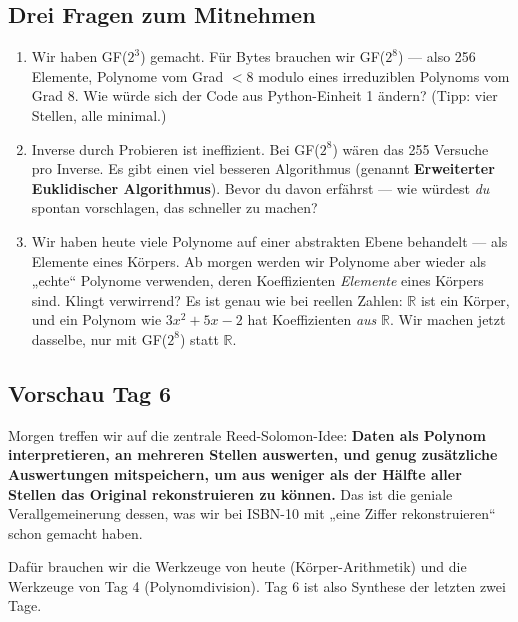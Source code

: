 \subsection*{Drei Fragen zum Mitnehmen}

\begin{enumerate}
\item Wir haben GF($2^3$) gemacht. Für Bytes brauchen wir GF($2^8$)
  — also 256 Elemente, Polynome vom Grad $< 8$ modulo eines
  irreduziblen Polynoms vom Grad 8. Wie würde sich der Code aus
  Python-Einheit 1 ändern? (Tipp: vier Stellen, alle minimal.)

\item Inverse durch Probieren ist ineffizient. Bei GF($2^8$) wären
  das 255 Versuche pro Inverse. Es gibt einen viel besseren
  Algorithmus (genannt \textbf{Erweiterter Euklidischer
  Algorithmus}). Bevor du davon erfährst — wie würdest \emph{du}
  spontan vorschlagen, das schneller zu machen?

\item Wir haben heute viele Polynome auf einer abstrakten Ebene
  behandelt — als Elemente eines Körpers. Ab morgen werden wir
  Polynome aber wieder als „echte“ Polynome verwenden, deren
  Koeffizienten \emph{Elemente} eines Körpers sind. Klingt
  verwirrend? Es ist genau wie bei reellen Zahlen: $\mathbb{R}$ ist
  ein Körper, und ein Polynom wie $3x^2 + 5x - 2$ hat Koeffizienten
  \emph{aus} $\mathbb{R}$. Wir machen jetzt dasselbe, nur mit
  GF($2^8$) statt $\mathbb{R}$.
\end{enumerate}

\subsection*{Vorschau Tag 6}

Morgen treffen wir auf die zentrale Reed-Solomon-Idee: \textbf{Daten
als Polynom interpretieren, an mehreren Stellen auswerten, und genug
zusätzliche Auswertungen mitspeichern, um aus weniger als der Hälfte
aller Stellen das Original rekonstruieren zu können.} Das ist die
geniale Verallgemeinerung dessen, was wir bei ISBN-10 mit „eine
Ziffer rekonstruieren“ schon gemacht haben.

Dafür brauchen wir die Werkzeuge von heute (Körper-Arithmetik) und
die Werkzeuge von Tag 4 (Polynomdivision). Tag 6 ist also Synthese
der letzten zwei Tage.

